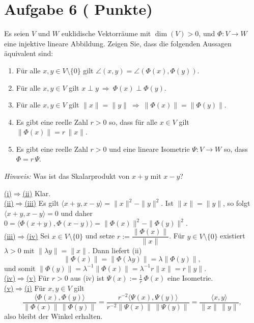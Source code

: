 \documentclass[11pt, a4paper]{article}
\newcommand{\aufgabe}[2]{%
  \section*{\Large\bfseries Aufgabe #1%
  \if\relax\detokenize{#2}\relax\else \hfill\normalfont\normalsize(#2 Punkte)\fi}%
  \vspace{-1.5ex}
}
\begin{document}
\aufgabe{6}{}
Es seien $V$ und $W$ euklidische Vektorräume mit $\dim(V)>0$, und $\Phi:V\to W$ eine injektive lineare Abbildung. Zeigen Sie, dass die folgenden Aussagen äquivalent sind:
\begin{enumerate}
  \item Für alle $x,y\in V\setminus\{0\}$ gilt $\angle(x,y)=\angle(\Phi(x),\Phi(y))$.
  \item Für alle $x,y\in V$ gilt $x\perp y\ \Rightarrow\ \Phi(x)\perp \Phi(y)$.
  \item Für alle $x,y\in V$ gilt $\|x\|=\|y\|\ \Rightarrow\ \|\Phi(x)\|=\|\Phi(y)\|$.
  \item Es gibt eine reelle Zahl $r>0$ so, dass für alle $x\in V$ gilt $\|\Phi(x)\|=r\,\|x\|$.
  \item Es gibt eine reelle Zahl $r>0$ und eine lineare Isometrie $\Psi:V\to W$ so, dass $\Phi=r\,\Psi$.
\end{enumerate}
\emph{Hinweis:} Was ist das Skalarprodukt von $x+y$ mit $x-y$?
\begin{framed}


\underline{(i)$\Rightarrow$(ii)} Klar. \\
\underline{(ii)$\Rightarrow$(iii)} Es gilt $\langle x+y,x-y\rangle=\|x\|^2-\|y\|^2$.
Ist $\|x\|=\|y\|$, so folgt $\langle x+y,x-y\rangle=0$ und daher
$0=\langle\Phi(x+y),\Phi(x-y)\rangle=\|\Phi(x)\|^2-\|\Phi(y)\|^2$. \\
\underline{(iii)$\Rightarrow$(iv)} Sei $x\in V\setminus\{0\}$ und setze
$r:=\dfrac{\|\Phi(x)\|}{\|x\|}$. Für $y\in V\setminus\{0\}$ existiert
$\lambda>0$ mit $\|\lambda y\|=\|x\|$. Dann liefert (ii)
\[
  \|\Phi(x)\|=\|\Phi(\lambda y)\|=\lambda\|\Phi(y)\|,
\]
und somit $\|\Phi(y)\|=\lambda^{-1}\|\Phi(x)\|=\lambda^{-1}r\|x\|
=r\|y\|$. \\
\underline{(iv)$\Rightarrow$(v)} Für $r>0$ aus (iv) ist
$\Psi(x):=\tfrac1r\,\Phi(x)$ eine Isometrie. \\
\underline{(v)$\Rightarrow$(i)} Für $x,y\in V$ gilt
\[
\frac{\langle \Phi(x),\Phi(y)\rangle}{\|\Phi(x)\|\,\|\Phi(y)\|}
=\frac{r^{-2}\langle \Psi(x),\Psi(y)\rangle}{r^{-2}\|\Psi(x)\|\,\|\Psi(y)\|}
=\frac{\langle x,y\rangle}{\|x\|\,\|y\|},
\]
also bleibt der Winkel erhalten.
\end{framed}
\end{document}
